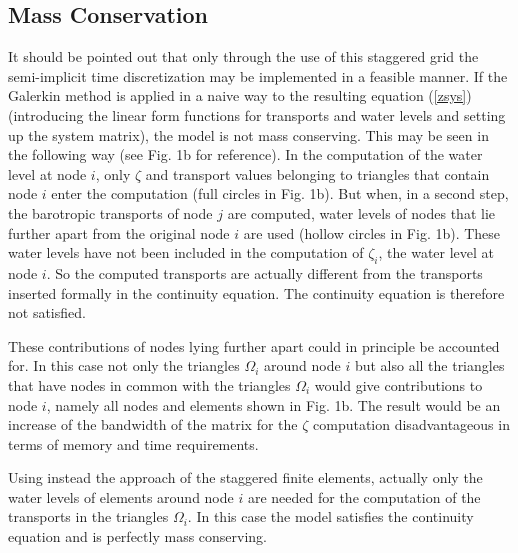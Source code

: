 
\subsection{Mass Conservation}

It should be pointed out that only through the use of this staggered grid
the semi-implicit time discretization may be implemented in a feasible
manner. If the Galerkin method is applied
 in a naive way to the resulting equation
(\ref{zsys}) (introducing the linear form functions for transports
and water levels and setting up the system matrix),
the model is not mass conserving.
This may be seen in the following way (see Fig. 1b for reference).
In the computation of the water level at
node $i$, only $\zeta$ and transport values
belonging to triangles that contain node $i$ enter the computation
(full circles in Fig. 1b).
But when, in a second step, the barotropic transports
of node $j$ are computed, water levels of nodes that lie further apart
from the original node $i$ are used
(hollow circles in Fig. 1b).
These water levels have not been included in
the computation of $\zeta_i$, the water level at node $i$.
So the computed transports are actually different
from the transports inserted formally in the continuity equation.
The continuity equation is therefore not satisfied.

These contributions of nodes lying further apart could in principle
be accounted for. In this case
not only the triangles
$\Omega_{i}$ around node $i$ but also all the triangles that have
nodes in common with the triangles $\Omega_{i}$ would give
contributions to node $i$, namely all nodes and elements shown
in Fig. 1b.
The result would be
an increase of the bandwidth of the matrix for the $\zeta$ computation
disadvantageous in terms of memory and time requirements.

Using instead the approach of the staggered finite elements, actually
only the water levels of elements around node $i$ are needed for
the computation of the transports in the triangles $\Omega_i$.
In this case the model satisfies the
continuity equation and is perfectly mass conserving.



